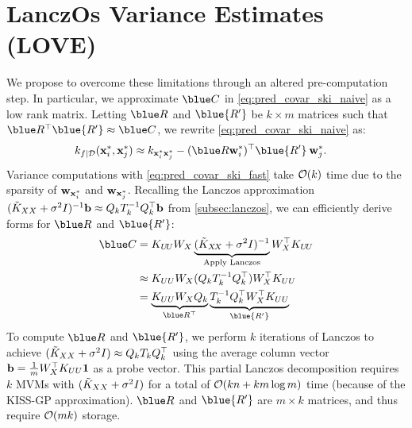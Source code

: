 \section{LanczOs Variance Estimates (LOVE)}
\label{sec:love_method}



We propose to overcome these limitations through an altered pre-computation step.
In particular, we approximate $\blue C$ in \eqref{eq:pred_covar_ski_naive} as a low rank matrix.
Letting $\blue R$ and $\blue{R'}$ be $k \times m$ matrices such that $\blue R^\top \blue{R'} \approx \blue C$, we rewrite \eqref{eq:pred_covar_ski_naive} as:
%
\begin{align}
  k_{f\mid\dset}(\bxtest_i, \bxtest_j) &\approx k_{\bxtest_i \bxtest_j} - (\blue R\bw^{*}_i )^{\top}\blue{R'} \: \bw^{*}_j.
    \label{eq:pred_covar_ski_fast}
\end{align}
%
Variance computations with \eqref{eq:pred_covar_ski_fast} take $\bigo{k}$ time
due to the sparsity of $\mathbf{w}_{\mathbf{x}^*_i}$ and $\mathbf{w}_{\mathbf{x}^*_j}$.
Recalling the Lanczos approximation
$
    (\tilde{K}_{XX} + \sigma^2 I)^{-1}\mathbf{b} \approx Q_{k}T^{-1}_{k}Q_{k}^{\top}\mathbf{b}
$
from \autoref{subsec:lanczos}, we can efficiently derive forms for $\blue R$ and $\blue{R'}$:
\begin{align*}
  \blue C &= \bK_{U \! U} W_{\bX} \underbrace{(\tilde{K}_{\bX\!\bX} + \sigma^2 \bI)^{-1}}_{\text{Apply Lanczos}} W^\top_{\bX} \bK_{U \! U} \\
         &\approx \bK_{UU} W_X (Q_k T_k^{-1} Q_k^\top) W_X^\top K_{UU} \\
         &= \underbrace{K_{UU} W_X Q_k}_{\blue R^\top} \underbrace{T_k^{-1} Q_k^\top W_X^\top \bK_{UU}}_{\blue{R'}}
\end{align*}
To compute $\blue R$ and $\blue{R'}$, we perform $k$ iterations of Lanczos to achieve $(\tilde{K}_{XX} + \sigma^2I)  \approx Q_{k}T_{k}Q_{k}^{\top}$ using the average column vector $\mathbf{b}=\frac{1}{m}W_X^\top K_{UU}\mathbf{1}$ as a probe vector.
This partial Lanczos decomposition requires $k$ MVMs with $(\tilde {K}_{XX} + \sigma^2 I)$ for a total of $\bigo{k n + k m \log m}$ time (because of the KISS-GP approximation).
$\blue R$ and $\blue{R'}$ are $m \times k$ matrices, and thus require $\bigo{mk}$ storage.

